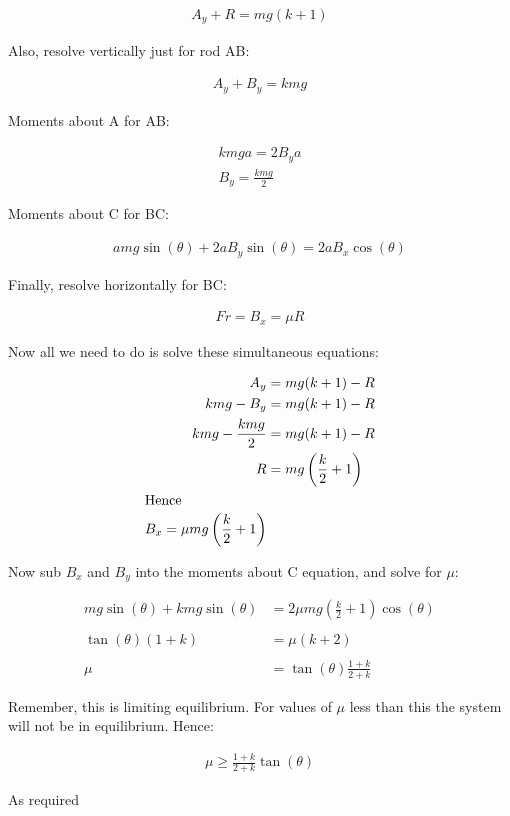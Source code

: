 \begin{problem}[A1987MsQ10p]
{\begin{align*} A_y + R = mg(k+1) \end{align*}

Also, resolve vertically just for rod AB:

\begin{align*} A_y + B_y = kmg \end{align*}

Moments about A for AB:

\begin{align*} kmga = 2B_{y}a \\
B_y = \frac{kmg}{2} \end{align*}

Moments about C for BC:

\begin{align*} amg\sin(\theta) + 2aB_{y}\sin(\theta) = 2aB_{x}\cos(\theta)\end{align*}

Finally, resolve horizontally for BC:

\begin{align*} Fr = B_x = \mu R \end{align*}

Now all we need to do is solve these simultaneous equations:

\begin{align*} A_y &= mg(k+1) -R\\
kmg - B_y &= mg(k+1)-R \\
kmg - \frac{kmg}{2} &= mg(k+1) -R \\
R &= mg\left(\frac{k}{2} + 1\right) \\
\intertext{Hence} B_x = \mu mg\left(\frac{k}{2} + 1\right)\end{align*}

Now sub $B_x$ and $B_y$ into the moments about C equation, and solve for $\mu$:

\begin{align*}mg\sin(\theta) + kmg\sin(\theta) &= 2\mu mg\left(\frac{k}{2} + 1\right)\cos(\theta) \\
\\ \tan(\theta)(1+k) &= \mu (k+2) \\
\\ \mu &= \tan(\theta) \frac{1+k}{2+k}\end{align*}

Remember, this is limiting equilibrium. For values of $\mu$ less than this the system will not be in equilibrium. Hence:

\begin{align*} \mu \ge  \frac{1+k}{2+k}\tan(\theta) \end{align*}

As required


}
\end{problem}